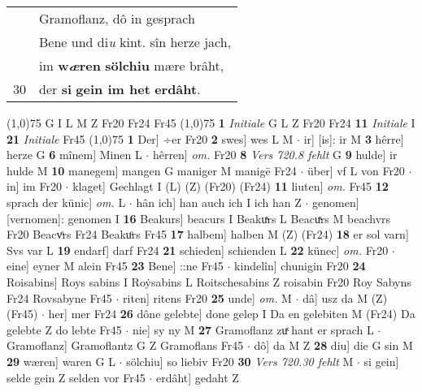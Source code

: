 \documentclass[8pt,a4paper,notitlepage]{article}
\begin{document}
\begin{table}[ht]
\begin{minipage}[t]{0.5\linewidth}
\begin{tabular}{rl}
 & Gramoflanz, dô in gesprach\\ 
 & Bene und di\textit{u} kint. sîn herze jach,\\ 
 & im \textbf{w\textit{æ}ren} \textbf{sölchiu} mære brâht,\\ 
30 & der \textbf{si} \textbf{gein im het} \textbf{erdâht}.\\ 
\end{tabular}
\scriptsize
\line(1,0){75} \newline
G I L M Z Fr20 Fr24 Fr45 \newline
\line(1,0){75} \newline
\textbf{1} \textit{Initiale} G L Z Fr20 Fr24  \textbf{11} \textit{Initiale} I  \textbf{21} \textit{Initiale} Fr45  \newline
\line(1,0){75} \newline
\textbf{1} Der] ÷er Fr20 \textbf{2} swes] wes L M  $\cdot$ ir] [is]: ir M \textbf{3} hêrre] herze G \textbf{6} mînem] Minen L  $\cdot$ hêrren] \textit{om.} Fr20 \textbf{8} \textit{Vers 720.8 fehlt} G  \textbf{9} hulde] ir hulde M \textbf{10} manegem] mangen G maniger M manigē Fr24  $\cdot$ über] vf L von Fr20  $\cdot$ in] im Fr20  $\cdot$ klaget] Gechlagt I (L) (Z) (Fr20) (Fr24) \textbf{11} liuten] \textit{om.} Fr45 \textbf{12} sprach der künic] \textit{om.} L  $\cdot$ hân ich] han auch ich I ich han Z  $\cdot$ genomen] [vernomen]: genomen I \textbf{16} Beakurs] beacurs I Beakuͯrs L Beacuͯrs M beachvrs Fr20 Beacvͦrs Fr24 Beakuͦrs Fr45 \textbf{17} halbem] halben M (Z) (Fr24) \textbf{18} er sol varn] Svs var L \textbf{19} endarf] darf Fr24 \textbf{21} schieden] schienden L \textbf{22} künec] \textit{om.} Fr20  $\cdot$ eine] eyner M alein Fr45 \textbf{23} Bene] ::ne Fr45  $\cdot$ kindelîn] chunigin Fr20 \textbf{24} Roisabins] Roys sabins I Roẏsabins L Roitschesabins Z roisabin Fr20 Roy Sabyns Fr24 Rovsabyne Fr45  $\cdot$ riten] ritens Fr20 \textbf{25} unde] \textit{om.} M  $\cdot$ dâ] usz da M (Z) (Fr45)  $\cdot$ her] mer Fr24 \textbf{26} dône gelebte] done gelep I Da en gelebiten M (Fr24) Da gelebte Z do lebte Fr45  $\cdot$ nie] sy ny M \textbf{27} Gramoflanz zuͯ hant er sprach L  $\cdot$ Gramoflanz] Gramoflantz G Z Gramoflans Fr45  $\cdot$ dô] da M Z \textbf{28} diu] die G sin M \textbf{29} wæren] waren G L  $\cdot$ sölchiu] so liebiv Fr20 \textbf{30} \textit{Vers 720.30 fehlt} M   $\cdot$ si gein] selde gein Z selden vor Fr45  $\cdot$ erdâht] gedaht Z \newline
\end{minipage}
\hspace{0.5cm}

\end{table}
\end{document}
